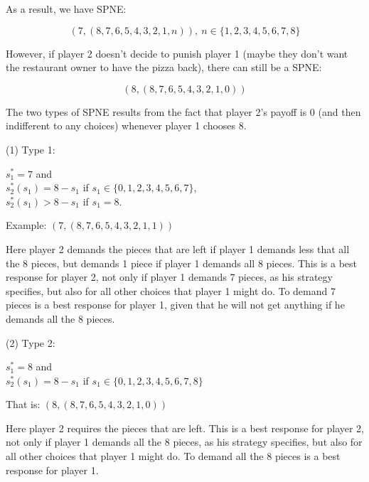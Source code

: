 \documentclass{article}
\begin{document}
\begin{mdframed}[backgroundcolor=blue!20,linecolor=white]
As a result, we have SPNE:

$$(7,(8,7,6,5,4,3,2,1,n)), \ n \in \{1,2,3,4,5,6,7,8\}$$

However, if player 2 doesn't decide to punish player 1 (maybe they don't want the restaurant owner to have the pizza back), there can still be a SPNE:

$$(8, (8,7,6,5,4,3,2,1,0))$$

The two types of SPNE results from the fact that player 2's payoff is 0 (and then indifferent to any choices) whenever player 1 chooses 8. 

\end{mdframed}

(1) Type 1:

$s^\ast_1 = 7$ and \\
$s^\ast_2(s_1) = 8 - s_1$ if $s_1 \in \{0,1,2,3,4,5,6,7\}$, \\
$s^\ast_2(s_1) > 8 - s_1$ if $s_1 = 8$. \\

\begin{mdframed}[backgroundcolor=blue!20,linecolor=white]
Example: $(7, (8,7,6,5,4,3,2,1,1))$ 

Here player 2 demands the pieces that are left if player 1 demands less that all the 8 pieces, but demands 1 piece if player 1 demands all 8 pieces. This is a best response for player 2, not only if player 1 demands 7 pieces, as his strategy specifies, but also for all other choices that player 1 might do. To demand 7 pieces is a best response for player 1, given that he will not get anything if he demands all the 8 pieces.

\end{mdframed}


(2) Type 2:

$s^\ast_1 = 8$ and \\
$s^\ast_2(s_1) = 8 - s_1$ if $s_1 \in \{0,1,2,3,4,5,6,7,8\}$ 

That is: $(8, (8,7,6,5,4,3,2,1,0))$

\begin{mdframed}[backgroundcolor=blue!20,linecolor=white]
Here player 2 requires the pieces that are left. This is a best response for player 2, not only if player 1 demands all the 8 pieces, as his strategy specifies, but also for all other choices that player 1 might do. To demand all the 8 pieces is a best response for player 1.
\end{mdframed}

%


\vspace{-6pt}
\end{document}
